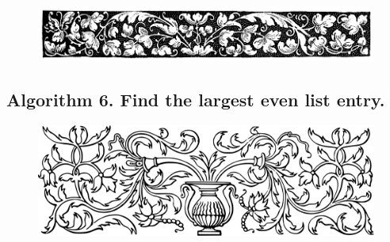 \documentclass[preview]{standalone}
\begin{document}
\begin{figure}[!h]
    \centering
    \includegraphics[width=14cm]{../resources/jpg/3.1.algorithms/border2.jpg}
\end{figure}
\subsection[Find the largest even list entry.]{
    \color{section} Algorithm 6. \color{black} Find the largest even list entry.
}
\vspace{-1\baselineskip}

\vspace{1\baselineskip}
\begin{center}
    
\end{center}
\vspace{1\baselineskip}
\begin{center}
    
\end{center}
\pagebreak


\begin{figure}[!h]
    \centering
    \includegraphics[width=14cm]{../resources/jpg/3.1.algorithms/border1.png}
\end{figure}
\end{document}
